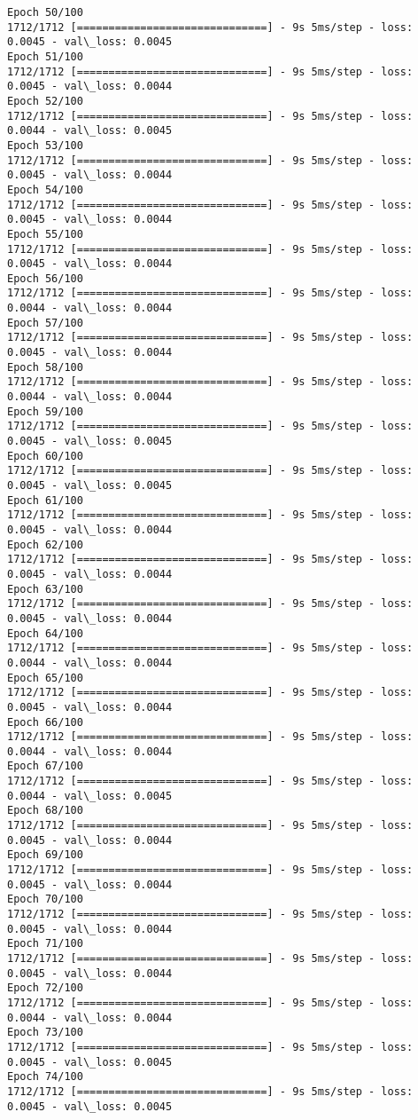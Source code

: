 \documentclass[11pt]{article}
\begin{document}
\begin{Verbatim}[commandchars=\\\{\}]
Epoch 50/100
1712/1712 [==============================] - 9s 5ms/step - loss: 0.0045 - val\_loss: 0.0045
Epoch 51/100
1712/1712 [==============================] - 9s 5ms/step - loss: 0.0045 - val\_loss: 0.0044
Epoch 52/100
1712/1712 [==============================] - 9s 5ms/step - loss: 0.0044 - val\_loss: 0.0045
Epoch 53/100
1712/1712 [==============================] - 9s 5ms/step - loss: 0.0045 - val\_loss: 0.0044
Epoch 54/100
1712/1712 [==============================] - 9s 5ms/step - loss: 0.0045 - val\_loss: 0.0044
Epoch 55/100
1712/1712 [==============================] - 9s 5ms/step - loss: 0.0045 - val\_loss: 0.0044
Epoch 56/100
1712/1712 [==============================] - 9s 5ms/step - loss: 0.0044 - val\_loss: 0.0044
Epoch 57/100
1712/1712 [==============================] - 9s 5ms/step - loss: 0.0045 - val\_loss: 0.0044
Epoch 58/100
1712/1712 [==============================] - 9s 5ms/step - loss: 0.0044 - val\_loss: 0.0044
Epoch 59/100
1712/1712 [==============================] - 9s 5ms/step - loss: 0.0045 - val\_loss: 0.0045
Epoch 60/100
1712/1712 [==============================] - 9s 5ms/step - loss: 0.0045 - val\_loss: 0.0045
Epoch 61/100
1712/1712 [==============================] - 9s 5ms/step - loss: 0.0045 - val\_loss: 0.0044
Epoch 62/100
1712/1712 [==============================] - 9s 5ms/step - loss: 0.0045 - val\_loss: 0.0044
Epoch 63/100
1712/1712 [==============================] - 9s 5ms/step - loss: 0.0045 - val\_loss: 0.0044
Epoch 64/100
1712/1712 [==============================] - 9s 5ms/step - loss: 0.0044 - val\_loss: 0.0044
Epoch 65/100
1712/1712 [==============================] - 9s 5ms/step - loss: 0.0045 - val\_loss: 0.0044
Epoch 66/100
1712/1712 [==============================] - 9s 5ms/step - loss: 0.0044 - val\_loss: 0.0044
Epoch 67/100
1712/1712 [==============================] - 9s 5ms/step - loss: 0.0044 - val\_loss: 0.0045
Epoch 68/100
1712/1712 [==============================] - 9s 5ms/step - loss: 0.0045 - val\_loss: 0.0044
Epoch 69/100
1712/1712 [==============================] - 9s 5ms/step - loss: 0.0045 - val\_loss: 0.0044
Epoch 70/100
1712/1712 [==============================] - 9s 5ms/step - loss: 0.0045 - val\_loss: 0.0044
Epoch 71/100
1712/1712 [==============================] - 9s 5ms/step - loss: 0.0045 - val\_loss: 0.0044
Epoch 72/100
1712/1712 [==============================] - 9s 5ms/step - loss: 0.0044 - val\_loss: 0.0044
Epoch 73/100
1712/1712 [==============================] - 9s 5ms/step - loss: 0.0045 - val\_loss: 0.0045
Epoch 74/100
1712/1712 [==============================] - 9s 5ms/step - loss: 0.0045 - val\_loss: 0.0045

\end{Verbatim}
\end{document}
